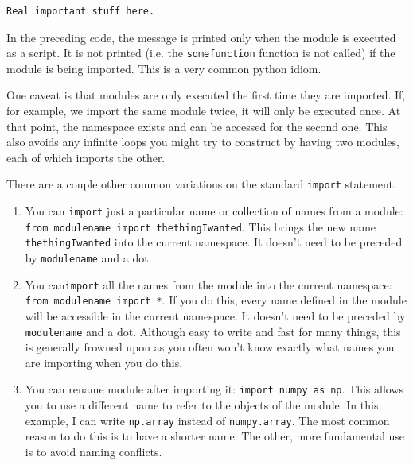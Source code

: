 \begin{Verbatim}
Real important stuff here.

\end{Verbatim}


In the preceding code, the message is printed only when the module is executed as a script.  It is not printed (i.e. the \texttt{somefunction} function is not called) if the module is being imported.  This is a very common python idiom.


One caveat is that modules are only executed the first time they are imported.  If, for example, we import the same module twice, it will only be executed once.  At that point, the namespace exists and can be accessed for the second one.  This also avoids any infinite loops you might try to construct by having two modules, each of which imports the other.


There are a couple other common variations on the standard \texttt{import} statement.

\begin{enumerate}

\item You can \texttt{import} just a particular name or collection of names from a module: \texttt{from modulename import thethingIwanted}.  This brings the new name \texttt{thethingIwanted} into the current namespace.  It doesn’t need to be preceded by \texttt{modulename} and a dot.

\item You can\texttt{import} all the names from the module into the current namespace: \texttt{from modulename import *}.  If you do this, every name defined in the module will be accessible in the current namespace.  It doesn’t need to be preceded by \texttt{modulename} and a dot.  Although easy to write and fast for many things, this is generally frowned upon as you often won’t know exactly what names you are importing when you do this.

\item You can rename module after importing it: \texttt{import numpy as np}.  This allows you to use a different name to refer to the objects of the module.  In this example, I can write \texttt{np.array} instead of \texttt{numpy.array}.  The most common reason to do this is to have a shorter name.  The other, more fundamental use is to avoid naming conflicts.

\end{enumerate}